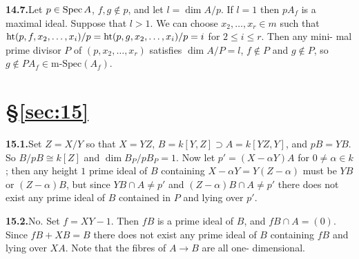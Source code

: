 \noindent\textbf{14.7.}\quad Let $p \in \operatorname{Spec} A$, $f, g \notin p$, and let $l = \dim A/p$. If $l = 1$ then $pA_f$ is a maximal
ideal. Suppose that $l > 1$. We can choose $x_2, \ldots, x_r \in m$ such that
$\operatorname{ht}(p, f, x_2, \ldots, x_i)/p = \operatorname{ht}(p, g, x_2, \ldots, x_i)/p = i$ for $2 \le i \le r$. Then any mini-
mal prime divisor $P$ of $(p, x_2, \ldots, x_r)$ satisfies $\dim A/P = l$, $f \notin P$ and $g \notin P$,
so $g \notin PA_f \in \text{m-Spec}(A_f)$.

\section*{\S\ref{sec:15}}

\noindent\textbf{15.1.}\quad Set $Z = X/Y$ so that $X = YZ$, $B = k[Y, Z] \supset A = k[YZ, Y]$, and $pB =
YB$. So $B/pB \cong k[Z]$ and $\dim B_P/pB_P = 1$. Now let $p' = (X - \alpha Y)A$ for
$0 \neq \alpha \in k$; then any height $1$ prime ideal of $B$ containing $X - \alpha Y =
Y(Z - \alpha)$ must be $YB$ or $(Z - \alpha)B$, but since $YB \cap A \neq p'$ and $(Z - \alpha)B \cap A \neq p'$
there does not exist any prime ideal of $B$ contained in $P$ and lying over $p'$.

\noindent\textbf{15.2.}\quad No. Set $f = XY - 1$. Then $fB$ is a prime ideal of $B$, and $fB \cap A = (0)$.
Since $fB + XB = B$ there does not exist any prime ideal of $B$ containing
$fB$ and lying over $XA$. Note that the fibres of $A \to B$ are all one-
dimensional.
